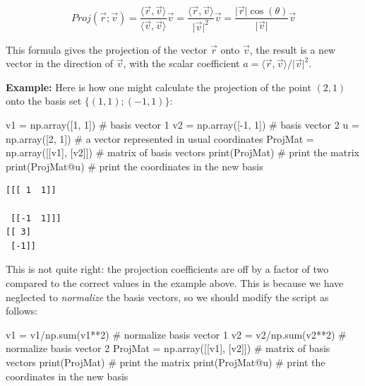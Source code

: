 \documentclass[
  letterpaper,
  DIV=11,
  numbers=noendperiod]{scrreprt}
\newenvironment{Shaded}{\begin{snugshade}}{\end{snugshade}}
\newcommand{\BuiltInTok}[1]{\textcolor[rgb]{0.00,0.23,0.31}{#1}}
\newcommand{\CommentTok}[1]{\textcolor[rgb]{0.37,0.37,0.37}{#1}}
\newcommand{\DecValTok}[1]{\textcolor[rgb]{0.68,0.00,0.00}{#1}}
\newcommand{\NormalTok}[1]{\textcolor[rgb]{0.00,0.23,0.31}{#1}}
\newcommand{\OperatorTok}[1]{\textcolor[rgb]{0.37,0.37,0.37}{#1}}
\begin{document}
\[ 
Proj(\vec r ; \vec v) = \frac{ \langle \vec r , \vec v \rangle  } {\langle \vec v , \vec v \rangle } \vec v = \frac{ \langle \vec r ,  \vec v \rangle  } {\vert \vec v \vert^2} \vec v= \frac{  \vert\vec r\vert \cos(\theta) } {\vert \vec v \vert}\vec v
\]

This formula gives the projection of the vector \(\vec r\) onto
\(\vec v\), the result is a new vector in the direction of \(\vec v\),
with the scalar coefficient
\(a = \langle \vec r ,\vec v \rangle /\vert \vec v \vert^2\).

\textbf{Example:} Here is how one might calculate the projection of the
point \((2,1)\) onto the basis set \(\{(1,1); (-1,1)\}\):

\begin{Shaded}
\begin{Highlighting}[]
\NormalTok{v1 }\OperatorTok{=}\NormalTok{ np.array([}\DecValTok{1}\NormalTok{, }\DecValTok{1}\NormalTok{]) }\CommentTok{\# basis vector 1}
\NormalTok{v2 }\OperatorTok{=}\NormalTok{ np.array([}\OperatorTok{{-}}\DecValTok{1}\NormalTok{, }\DecValTok{1}\NormalTok{]) }\CommentTok{\# basis vector 2}
\NormalTok{u }\OperatorTok{=}\NormalTok{ np.array([}\DecValTok{2}\NormalTok{, }\DecValTok{1}\NormalTok{])  }\CommentTok{\# a vector represented in usual coordinates}
\NormalTok{ProjMat }\OperatorTok{=}\NormalTok{ np.array([[v1], [v2]]) }\CommentTok{\# matrix of basis vectors}
\BuiltInTok{print}\NormalTok{(ProjMat) }\CommentTok{\# print the matrix}
\BuiltInTok{print}\NormalTok{(ProjMat}\OperatorTok{@}\NormalTok{u) }\CommentTok{\# print the coordinates in the new basis}
\end{Highlighting}
\end{Shaded}

\begin{verbatim}
[[[ 1  1]]

 [[-1  1]]]
[[ 3]
 [-1]]
\end{verbatim}

This is not quite right: the projection coefficients are off by a factor
of two compared to the correct values in the example above. This is
because we have neglected to \emph{normalize} the basis vectors, so we
should modify the script as follows:

\begin{Shaded}
\begin{Highlighting}[]
\NormalTok{v1 }\OperatorTok{=}\NormalTok{ v1}\OperatorTok{/}\NormalTok{np.}\BuiltInTok{sum}\NormalTok{(v1}\OperatorTok{**}\DecValTok{2}\NormalTok{) }\CommentTok{\# normalize basis vector 1}
\NormalTok{v2 }\OperatorTok{=}\NormalTok{ v2}\OperatorTok{/}\NormalTok{np.}\BuiltInTok{sum}\NormalTok{(v2}\OperatorTok{**}\DecValTok{2}\NormalTok{) }\CommentTok{\# normalize basis vector 2}
\NormalTok{ProjMat }\OperatorTok{=}\NormalTok{ np.array([[v1], [v2]]) }\CommentTok{\# matrix of basis vectors}
\BuiltInTok{print}\NormalTok{(ProjMat) }\CommentTok{\# print the matrix}
\BuiltInTok{print}\NormalTok{(ProjMat}\OperatorTok{@}\NormalTok{u) }\CommentTok{\# print the coordinates in the new basis}
\end{Highlighting}
\end{Shaded}
\end{document}
